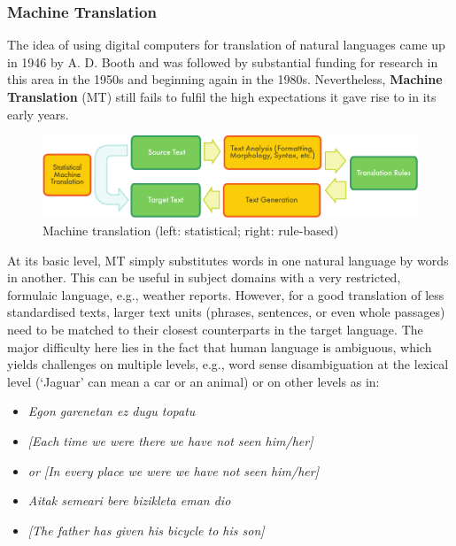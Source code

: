 \begin{multicols}{2}
\subsubsection{Machine Translation}
    The idea of using digital computers for translation of natural languages came up in 1946 by A. D. Booth and was followed by substantial funding for research in this area in the 1950s and beginning again in the 1980s. Nevertheless, \textbf{Machine Translation} (MT) still fails to fulfil the high expectations it gave rise to in its early years. 
    

\begin{figure}[htb]
  \center
  \includegraphics[width=\textwidth]{../_media/english/machine_translation}
  \caption{Machine translation (left: statistical; right: rule-based)}
  \label{fig:mtarch_en}
\end{figure}

At its basic level, MT simply substitutes words in one natural language by words in another. This can be useful in subject domains with a very restricted, formulaic language, e.g., weather reports. However, for a good translation of less standardised texts, larger text units (phrases, sentences, or even whole passages) need to be matched to their closest counterparts in the target language. The major difficulty here lies in the fact that human language is ambiguous, which yields challenges on multiple levels, e.g., 
word sense disambiguation at the lexical level (‘Jaguar’ can mean a car or an animal) or on other levels as in:

\begin{itemize}
\item[] \textit{Egon garenetan ez dugu topatu}
\item[] \textit{[Each time we were there we have not seen him/her]}
\item[] \textit{or [In every place we were we have not seen him/her]}\\
\item[] \textit{Aitak semeari bere bizikleta eman dio}
\item[] \textit{[The father has given his bicycle to his son]}
\end{itemize}



\end{multicols}
